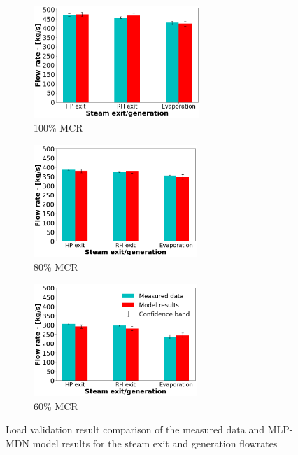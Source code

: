 \documentclass[a4paper,fleqn]{cas-sc}
\begin{document}
\begin{figure}
\centering
\begin{subfigure}{0.33\textwidth}
\includegraphics[width=\linewidth, height = 4.25cm]{100_CASE_STEAM}
        \caption{100\% MCR}
\end{subfigure}\hfill %
\begin{subfigure}{0.33\textwidth}
    \includegraphics[width=\linewidth, height = 4.25cm]{80_CASE_STEAM}
    \caption{80\% MCR}
\end{subfigure}\hfill
\begin{subfigure}{0.33\textwidth}
	\includegraphics[width=\linewidth, height = 4.25cm]{60_CASE_STEAM}
    \caption{60\% MCR}
\end{subfigure}
\caption{Load validation result comparison of the measured data and MLP-MDN model results for the steam exit and generation flowrates}
\label{fig_steam_gen}
\end{figure}
\end{document}
